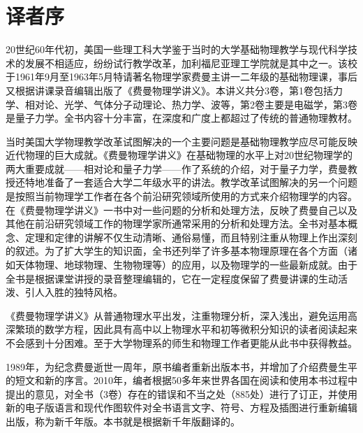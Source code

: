 \documentclass[UTF8, 12pt, a4paper, twoside]{ctexbook}
\begin{document}
\begin{titlepage}	
    
\end{titlepage}
\thispagestyle{empty}

\begin{titlepage}	
    
\end{titlepage}
\thispagestyle{empty}

\chapter*{译者序}

20世纪60年代初，美国一些理工科大学鉴于当时的大学基础物理教学与现代科学技术的发展不相适应，纷纷试行教学改革，加利福尼亚理工学院就是其中之一。该校于1961年9月至1963年5月特请著名物理学家费曼主讲一二年级的基础物理课，事后又根据讲课录音编辑出版了《费曼物理学讲义》。本讲义共分3卷，第1卷包括力学、相对论、光学、气体分子动理论、热力学、波等，第2卷主要是电磁学，第3卷是量子力学。全书内容十分丰富，在深度和广度上都超过了传统的普通物理教材。

当时美国大学物理教学改革试图解决的一个主要问题是基础物理教学应尽可能反映近代物理的巨大成就。《费曼物理学讲义》在基础物理的水平上对20世纪物理学的两大重要成就——相对论和量子力学——作了系统的介绍，对于量子力学，费曼教授还特地准备了一套适合大学二年级水平的讲法。教学改革试图解决的另一个问题是按照当前物理学工作者在各个前沿研究领域所使用的方式来介绍物理学的内容。在《费曼物理学讲义》一书中对一些问题的分析和处理方法，反映了费曼自己以及其他在前沿研究领域工作的物理学家所通常采用的分析和处理方法。全书对基本概念、定理和定律的讲解不仅生动清晰、通俗易懂，而且特别注重从物理上作出深刻的叙述。为了扩大学生的知识面，全书还列举了许多基本物理原理在各个方面（诸如天体物理、地球物理、生物物理等）的应用，以及物理学的一些最新成就。由于全书是根据课堂讲授的录音整理编辑的，它在一定程度保留了费曼讲课的生动活泼、引人入胜的独特风格。

《费曼物理学讲义》从普通物理水平出发，注重物理分析，深入浅出，避免运用高深繁琐的数学方程，因此具有高中以上物理水平和初等微积分知识的读者阅读起来不会感到十分困难。至于大学物理系的师生和物理工作者更能从此书中获得教益。

1989年，为纪念费曼逝世一周年，原书编者重新出版本书，并增加了介绍费曼生平的短文和新的序言。2010年，编者根据50多年来世界各国在阅读和使用本书过程中提出的意见，对全书（3卷）存在的错误和不当之处（885处）进行了订正，并使用新的电子版语言和现代作图软件对全书语言文字、符号、方程及插图进行重新编辑出版，称为新千年版。本书就是根据新千年版翻译的。
\end{document}
